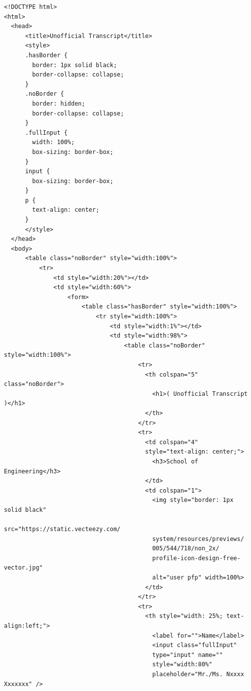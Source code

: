 \documentclass[12pt]{report} %
\begin{document}
\begin{verbatim}
<!DOCTYPE html>
<html>
  <head>
      <title>Unofficial Transcript</title>
      <style>
      .hasBorder {
        border: 1px solid black;
        border-collapse: collapse;
      }
      .noBorder {
        border: hidden;
        border-collapse: collapse;
      }
      .fullInput {
        width: 100%;
        box-sizing: border-box;
      }
      input {
        box-sizing: border-box;
      }
      p {
        text-align: center;
      }
      </style>
  </head>
  <body>
      <table class="noBorder" style="width:100%">
          <tr>
              <td style="width:20%"></td>
              <td style="width:60%">
                  <form>
                      <table class="hasBorder" style="width:100%">
                          <tr style="width:100%">
                              <td style="width:1%"></td>
                              <td style="width:98%">
                                  <table class="noBorder" style="width:100%">
                                      <tr>
                                        <th colspan="5" class="noBorder">
                                          <h1>( Unofficial Transcript )</h1>
                                        </th>
                                      </tr>
                                      <tr>
                                        <td colspan="4"
                                        style="text-align: center;">
                                          <h3>School of Engineering</h3>
                                        </td>
                                        <td colspan="1">
                                          <img style="border: 1px solid black"
                                          src="https://static.vecteezy.com/
                                          system/resources/previews/
                                          005/544/718/non_2x/
                                          profile-icon-design-free-vector.jpg"
                                          alt="user pfp" width=100%>
                                        </td>
                                      </tr>
                                      <tr>
                                        <th style="width: 25%; text-align:left;">
                                          <label for="">Name</label>
                                          <input class="fullInput"
                                          type="input" name=""
                                          style="width:80%"
                                          placeholder="Mr./Ms. Nxxxx Xxxxxxx" />

\end{verbatim}
\end{document}
